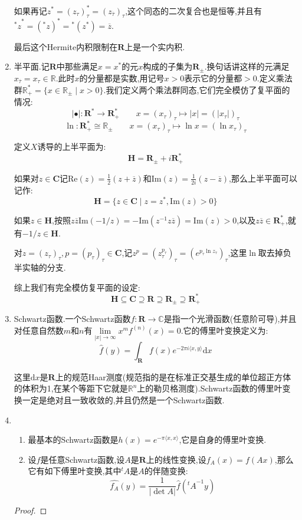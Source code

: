\begin{enumerate}
	如果再记$z^*=(z_{\tau})_{\tau}^*=(z_{\overline{\tau}})_{\tau}$,这个同态的二次复合也是恒等,并且有${^*z}^*=({^*z})^*={^*(z^*)}=\overline{z}$.
	
	最后这个Hermite内积限制在$\textbf{R}$上是一个实内积.
	\item 半平面.记$\textbf{R}$中那些满足$x=x^*$的元$x$构成的子集为$\textbf{R}_{\pm}$.换句话讲这样的元满足$x_{\overline{\tau}}=x_{\tau}\in\mathbb{R}$.此时$x$的分量都是实数,用记号$x>0$表示它的分量都$>0$.定义乘法群$\mathbb{R}_+^*=\{x\in\mathbb{R}_{\pm}\mid x>0\}$.我们定义两个乘法群同态,它们完全模仿了复平面的情况:
	$$|\bullet|:\textbf{R}^*\to\textbf{R}_+^*\qquad x=(x_{\tau})_{\tau}\mapsto|x|=(|x_{\tau}|)_{\tau}$$
	$$\ln:\textbf{R}_+^*\cong \mathbb{R}_{\pm}\qquad x=(x_{\tau})_{\tau}\mapsto\ln x=(\ln x_{\tau})_{\tau}$$
	
	定义$X$诱导的上半平面为:
	$$\textbf{H}=\textbf{R}_{\pm}+i\textbf{R}^*_+$$
	
	如果对$z\in\textbf{C}$记$\mathrm{Re}(z)=\frac{1}{2}(z+\overline{z})$和$\mathrm{Im}(z)=\frac{1}{2i}(z-\overline{z})$,那么上半平面可以记作:
	$$\textbf{H}=\{z\in\textbf{C}\mid z=z^*,\mathrm{Im}(z)>0\}$$
	
	如果$z\in\textbf{H}$,按照$z\overline{z}\mathrm{Im}(-1/z)=-\mathrm{Im}(z^{-1}z\overline{z})=\mathrm{Im}(z)>0$,以及$z\overline{z}\in\textbf{R}_+^*$,就有$-1/z\in\textbf{H}$.
	
	对$z=(z_{\tau})_{\tau},p=(p_{\tau})_{\tau}\in\textbf{C}$,记$z^p=(z_{\tau}^{p_{\tau}})_{\tau}=(e^{p_{\tau}\ln z_{\tau}})_{\tau}$,这里$\ln$取去掉负半实轴的分支.
	
	综上我们有完全模仿复平面的设定:
	$$\textbf{H}\subseteq\textbf{C}\supseteq\textbf{R}\supseteq\textbf{R}_{\pm}\supseteq\textbf{R}_+^*$$
	\item Schwartz函数.一个Schwartz函数$f:\textbf{R}\to\mathbb{C}$是指一个光滑函数(任意阶可导),并且对任意自然数$m$和$n$有$\lim\limits_{|x|\to\infty}x^mf^{(n)}(x)=0$.它的傅里叶变换定义为:
	$$\widehat{f}(y)=\int_{\textbf{R}}f(x)e^{-2\pi i\langle x,y\rangle}\mathrm{d}x$$
	
	这里$\mathrm{d}x$是$\textbf{R}$上的规范Haar测度(规范指的是在标准正交基生成的单位超正方体的体积为1,在某个等距下它就是$\mathbb{R}^n$上的勒贝格测度).Schwartz函数的傅里叶变换一定是绝对且一致收敛的,并且仍然是一个Schwartz函数.
	\item 
	\begin{enumerate}[(1)]
		\item 最基本的Schwartz函数是$h(x)=e^{-\pi\langle x,x\rangle}$,它是自身的傅里叶变换.
		\item 设$f$是任意Schwartz函数,设$A$是$\textbf{R}$上的线性变换,设$f_A(x)=f(Ax)$,那么它有如下傅里叶变换,其中${^tA}$是$A$的伴随变换:
		$$\widehat{f_A}(y)=\frac{1}{|\det A|}\widehat{f}({^tA}^{-1}y)$$
	\end{enumerate}
    \begin{proof}
    	

\end{proof}
\end{enumerate}
